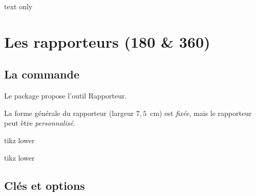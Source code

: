 \documentclass[french,a4paper,11pt]{article}
\newcommand\affichegrille[4]{%
	\draw[xstep=1,ystep=1,lightgray] (#1,#3) grid (#2,#4) ;
	\foreach \x in {#1,\inteval{1+#1},...,#2} {\draw[lightgray] (\x,#4)--++(0,3pt) node[font=\scriptsize,above] {$\x$} ;}
	\foreach \y in {#3,\inteval{1+#3},...,#4} {\draw[lightgray] (#1,\y)--++(-3pt,0) node[font=\scriptsize,left] {$\y$} ;}
}
\newcommand\pointsutiles[1]{%
	\foreach \point in {#1} {\draw[thick,fill=red] \point circle[radius=3pt] ;}
}
\begin{document}
\begin{PresentationCode}{text only}
\end{PresentationCode}

\pagebreak

\section{Les rapporteurs (180 \&{} 360)}

\subsection{La commande}

\begin{cautionblock}
Le package propose l'outil \textsf{Rapporteur}.

La forme générale du rapporteur (largeur $7,5$~cm) est \textit{fixée}, mais le rapporteur peut être \textit{personnalisé}.
\end{cautionblock}

\begin{PresentationCode}{tikz lower}
\tkzRapporteur
\end{PresentationCode}

\begin{PresentationCode}{tikz lower}
\tkzRapporteur[Complet]
\end{PresentationCode}

\subsection{Clés et options}
\end{document}
